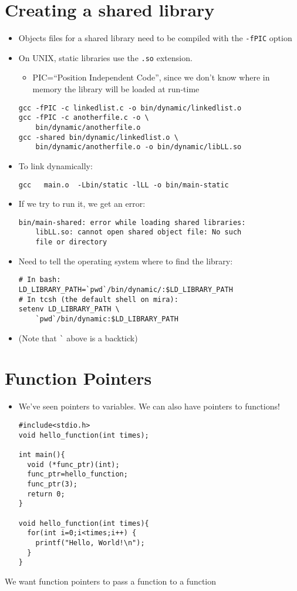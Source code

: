 \documentclass{article}
\begin{document}
\section{Creating a shared library}
\begin{itemize}
\item Objects files for a shared library need to be compiled with the \verb!-fPIC! option
\item On UNIX, static libraries use the \verb!.so! extension.
\begin{itemize}
\item PIC=``Position Independent Code'', since we don't know where in memory the library will be loaded at run-time
\end{itemize}
\begin{verbatim}
gcc -fPIC -c linkedlist.c -o bin/dynamic/linkedlist.o
gcc -fPIC -c anotherfile.c -o \
    bin/dynamic/anotherfile.o
gcc -shared bin/dynamic/linkedlist.o \
    bin/dynamic/anotherfile.o -o bin/dynamic/libLL.so
\end{verbatim}
\item To link dynamically:
\begin{verbatim}
gcc   main.o  -Lbin/static -lLL -o bin/main-static
\end{verbatim} 
\end{itemize}



\begin{itemize}
\item If we try to run it, we get an error:
\begin{verbatim}
bin/main-shared: error while loading shared libraries:
    libLL.so: cannot open shared object file: No such
    file or directory
\end{verbatim} 
\item Need to tell the operating system where to find the library:
\begin{verbatim}
# In bash:
LD_LIBRARY_PATH=`pwd`/bin/dynamic/:$LD_LIBRARY_PATH
# In tcsh (the default shell on mira):
setenv LD_LIBRARY_PATH \
    `pwd`/bin/dynamic:$LD_LIBRARY_PATH
\end{verbatim}
\item (Note that \verb!`! above is a backtick)
\end{itemize}



\section{Function Pointers}
\begin{itemize}
\item We've seen pointers to variables. We can also have pointers to functions!
\begin{verbatim}
#include<stdio.h>
void hello_function(int times);

int main(){
  void (*func_ptr)(int);
  func_ptr=hello_function;
  func_ptr(3);
  return 0;
}

void hello_function(int times){
  for(int i=0;i<times;i++) {
    printf("Hello, World!\n");
  }
}
\end{verbatim}
\end{itemize}
We want function pointers to pass a function to a function
\end{document}
